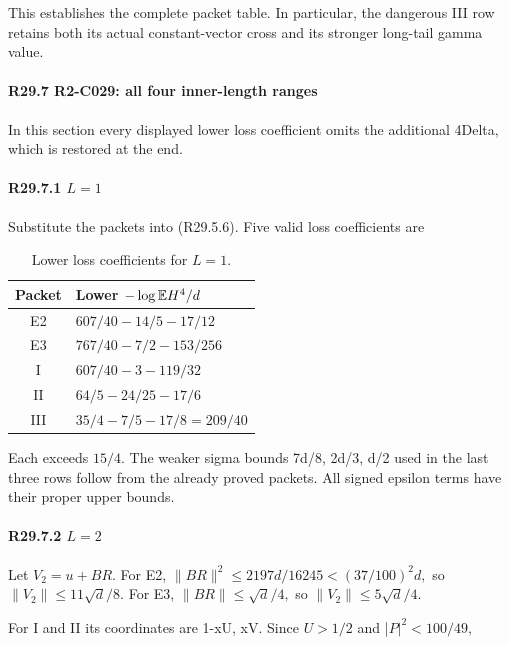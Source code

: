 This establishes the complete packet table. In particular, the dangerous
III row retains both its actual constant-vector cross and its stronger
long-tail gamma value.

\paragraph{R29.7 R2-C029: all four inner-length ranges}

In this section every displayed lower loss coefficient omits the
additional 4Delta, which is restored at the end.

\paragraph{R29.7.1 \(L=1\)}

Substitute the packets into (R29.5.6). Five valid loss coefficients are

\begin{table}[htbp]
\centering\small
\setlength{\tabcolsep}{5pt}
\caption{Lower loss coefficients for $L=1$.}\label{tab:oc:r29-L1}
\begin{tabular}{cl}
\toprule
Packet & Lower $-\log\mathbb E H^4/d$\\
\midrule
E2 & $607/40-14/5-17/12$\\
E3 & $767/40-7/2-153/256$\\
I & $607/40-3-119/32$\\
II & $64/5-24/25-17/6$\\
III & $35/4-7/5-17/8=209/40$\\
\bottomrule
\end{tabular}
\end{table}

Each exceeds \(15/4.\) The weaker sigma bounds 7d/8, 2d/3, d/2
used in the last three rows follow from the already proved packets.
All signed epsilon terms have their proper upper bounds.

\paragraph{R29.7.2 \(L=2\)}

Let \(V_2=u+BR.\) For E2,
\(\lVert BR\rVert ^2\le 2197d/16245<(37/100)^2d,\allowbreak \) so
\(\lVert V_2\rVert \le 11\sqrt{d}/8.\) For E3, \(\lVert BR\rVert \le \sqrt{d}/4,\allowbreak \)
so \(\lVert V_2\rVert \le 5\sqrt{d}/4.\)

For I and II its coordinates are 1-xU, xV. Since \(U>1/2\) and
|\(P|^2<100/49,\allowbreak \)

